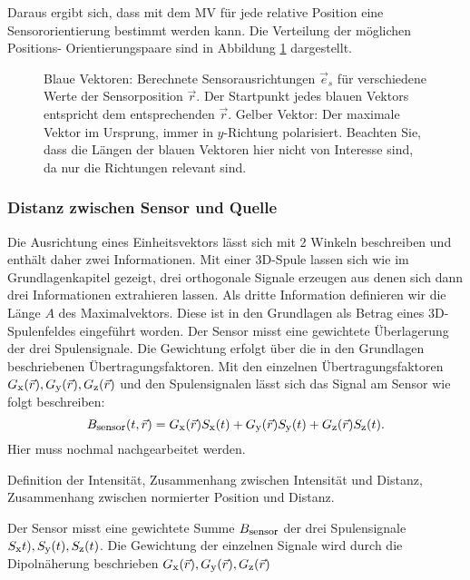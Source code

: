     Daraus ergibt sich, dass mit dem MV für jede relative Position eine Sensororientierung bestimmt werden kann. Die Verteilung der möglichen Positions- Orientierungspaare sind in Abbildung \ref{fig:PotentialPoses} dargestellt.
    
    \begin{figure}[h]
        \centering
        \caption{ Blaue Vektoren: Berechnete Sensorausrichtungen $\vec e_s$ für verschiedene Werte der Sensorposition $\vec r$. Der Startpunkt jedes blauen Vektors entspricht dem entsprechenden $\vec r$. Gelber Vektor: Der maximale Vektor im Ursprung, immer in $y$-Richtung polarisiert. Beachten Sie, dass die Längen der blauen Vektoren hier nicht von Interesse sind, da nur die Richtungen relevant sind.}
        \label{fig:PotentialPoses}
    \end{figure} 

	\subsubsection{Distanz zwischen Sensor und Quelle}
        Die Ausrichtung eines Einheitsvektors lässt sich mit 2 Winkeln beschreiben und enthält daher zwei Informationen. Mit einer 3D-Spule lassen sich wie im Grundlagenkapitel gezeigt, drei orthogonale Signale erzeugen aus denen sich dann drei Informationen extrahieren lassen. Als dritte Information definieren wir die Länge $A$ des Maximalvektors. Diese ist in den Grundlagen als Betrag eines 3D-Spulenfeldes eingeführt worden. Der Sensor misst eine gewichtete Überlagerung der drei Spulensignale. Die Gewichtung erfolgt über die in den Grundlagen beschriebenen Übertragungsfaktoren. Mit den einzelnen Übertragungsfaktoren $G_{\textrm{\footnotesize{x}}}(\vec{r}),G_{\textrm{\footnotesize{y}}}(\vec{r}),G_{\textrm{\footnotesize{z}}}(\vec{r})$ und den Spulensignalen lässt sich das Signal am Sensor wie folgt beschreiben:
        \begin{equation}
            B_{\textrm{\footnotesize{sensor}}}(t,\vec{r}) = G_{\textrm{\footnotesize{x}}}(\vec{r}) S_{\textrm{\footnotesize{x}}}(t) +G_{\textrm{\footnotesize{y}}}(\vec{r}) S_{\textrm{\footnotesize{y}}}(t) + G_{\textrm{\footnotesize{z}}}(\vec{r}) S_{\textrm{\footnotesize{z}}}(t).
            \label{eq:GewSensSignal}
        \end{equation}
        Hier muss nochmal nachgearbeitet werden.
        
        Definition der Intensität, Zusammenhang zwischen Intensität und Distanz, Zusammenhang zwischen normierter Position und Distanz.

        Der Sensor misst eine gewichtete Summe $B_{\textrm{\footnotesize{sensor}}}$ der drei Spulensignale $S_{\textrm{\footnotesize{x}}}t),S_{\textrm{\footnotesize{y}}}(t),S_{\textrm{\footnotesize{z}}}(t)$. Die Gewichtung der einzelnen Signale wird durch die Dipolnäherung beschrieben $G_{\textrm{\footnotesize{x}}}(\vec{r}),G_{\textrm{\footnotesize{y}}}(\vec{r}),G_{\textrm{\footnotesize{z}}}(\vec{r})$
 
